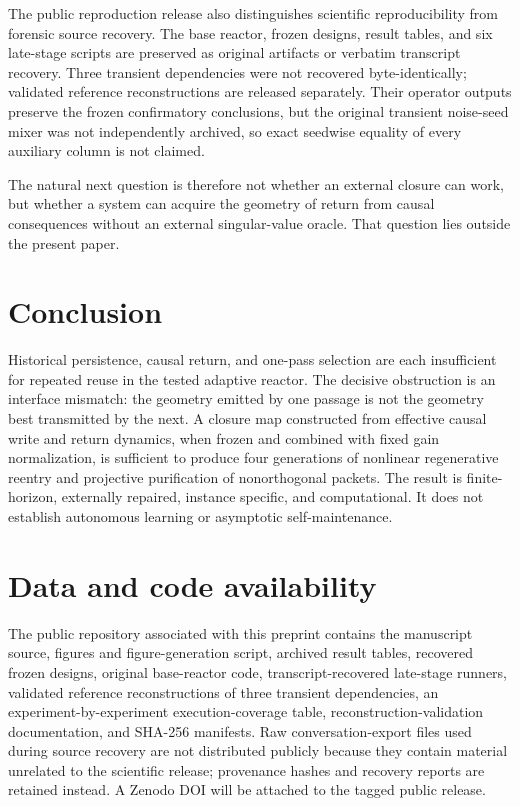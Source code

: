\documentclass[aps,pre,preprint,superscriptaddress,nofootinbib]{revtex4-2}
\begin{document}
The public reproduction release also distinguishes scientific reproducibility from forensic source recovery. The base reactor, frozen designs, result tables, and six late-stage scripts are preserved as original artifacts or verbatim transcript recovery. Three transient dependencies were not recovered byte-identically; validated reference reconstructions are released separately. Their operator outputs preserve the frozen confirmatory conclusions, but the original transient noise-seed mixer was not independently archived, so exact seedwise equality of every auxiliary column is not claimed.

The natural next question is therefore not whether an external closure can work, but whether a system can acquire the geometry of return from causal consequences without an external singular-value oracle. That question lies outside the present paper.

\section{Conclusion}

Historical persistence, causal return, and one-pass selection are each insufficient for repeated reuse in the tested adaptive reactor. The decisive obstruction is an interface mismatch: the geometry emitted by one passage is not the geometry best transmitted by the next. A closure map constructed from effective causal write and return dynamics, when frozen and combined with fixed gain normalization, is sufficient to produce four generations of nonlinear regenerative reentry and projective purification of nonorthogonal packets. The result is finite-horizon, externally repaired, instance specific, and computational. It does not establish autonomous learning or asymptotic self-maintenance.

\section*{Data and code availability}

The public repository associated with this preprint contains the manuscript source, figures and figure-generation script, archived result tables, recovered frozen designs, original base-reactor code, transcript-recovered late-stage runners, validated reference reconstructions of three transient dependencies, an experiment-by-experiment execution-coverage table, reconstruction-validation documentation, and SHA-256 manifests. Raw conversation-export files used during source recovery are not distributed publicly because they contain material unrelated to the scientific release; provenance hashes and recovery reports are retained instead. A Zenodo DOI will be attached to the tagged public release.
\end{document}
